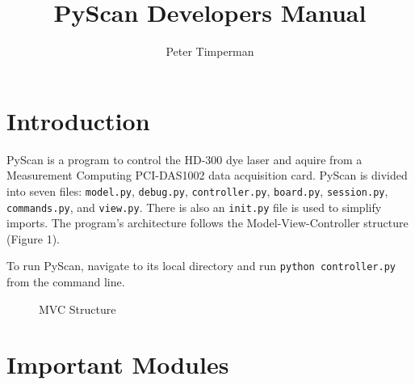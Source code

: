 \documentclass[11pt]{article}
\begin{document}
\author{Peter Timperman}
\title{PyScan Developers Manual}
\maketitle
\section{Introduction}
    PyScan is a program to control the HD-300 dye laser and aquire from a Measurement Computing PCI-DAS1002 data acquisition card. 
    PyScan is divided into seven files: \texttt{model.py}, \texttt{debug.py}, \texttt{controller.py}, \texttt{board.py}, \texttt{session.py}, \texttt{commands.py}, and \texttt{view.py}. There is also an \texttt{\textunderscore\textunderscore init.py\textunderscore\textunderscore} file is used to simplify imports. The program's architecture follows the Model-View-Controller structure (Figure 1). 
    
    To run PyScan, navigate to its local directory and run \texttt{python controller.py} from the command line.

\begin{figure}[h]
    \centering
    \caption{MVC Structure}
\end{figure} 
\section{Important Modules}
\end{document}

